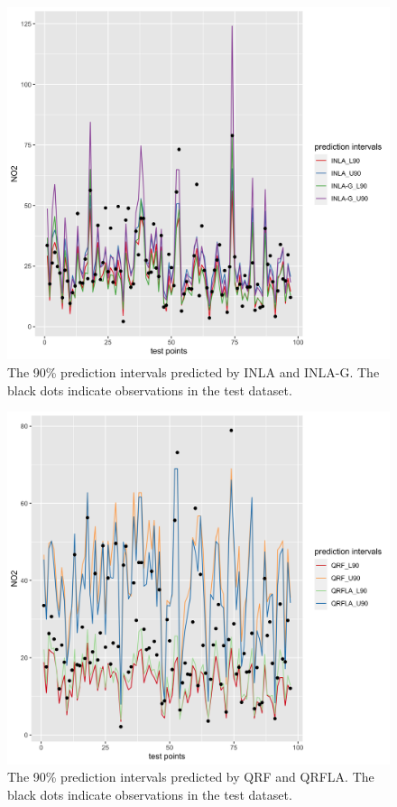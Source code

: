 \documentclass{article}
\begin{document}
\begin{figure}
\centering
\includegraphics[scale = 0.2]{fig/INLA_pred.png}

\caption{The 90\% prediction intervals predicted by INLA and INLA-G. The black dots indicate observations in the test dataset.}
\label{inlapred}
\end{figure}

\begin{figure}
\centering
\includegraphics[scale = 0.2]{fig/qrf_qrfla.png}
\caption{The 90\% prediction intervals predicted by QRF and QRFLA. The black dots indicate observations in the test dataset.}
\label{qrrfla}
\end{figure}
\end{document}
